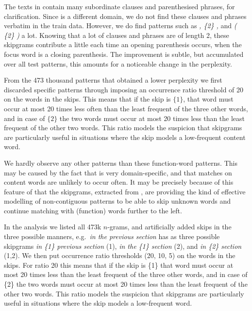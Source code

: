 The texts in \emea contain many subordinate clauses and parenthesised phrases, for clarification. Since \obw is a different domain, we do not find these clauses and phrases verbatim in the train data. However, we do find patterns such as \emph{, \{2\} ,} and \emph{( \{2\} )} a lot. Knowing that a lot of clauses and phrases are of length 2, these skipgrams contribute a little each time an opening parenthesis occurs, when the focus word is a closing parenthesis. The improvement is subtle, but accumulated over all test patterns, this amounts for a noticeable change in the perplexity.

From the 473 thousand patterns that obtained a lower perplexity we first discarded specific patterns through imposing an occurrence ratio threshold of 20 on the words in the skips. This means that if the skip is $\{1\}$, that word must occur at most 20 times less often than the least frequent of the three other words, and in case of $\{2\}$ the two words must occur at most 20 times less than the least frequent of the other two words. This ratio models the suspicion that skipgrams are particularly useful in situations where the skip models a low-frequent content word. 

We hardly observe any other patterns than these function-word patterns. 
This may be caused by the fact that \emea is very domain-specific, and that matches on content words are unlikely to occur often. It may be precisely because of this feature of \emea that the skipgrams, extracted from \obw, are providing the kind of effective modelling of non-contiguous patterns to be able to skip unknown words and continue matching with (function) words further to the left.

In the analysis we listed all 473k $n$-grams, and artificially added skips in the three possible manners, e.g.~\emph{in the previous section} has as three possible skipgrams \emph{in \{1\} previous section} (1), \emph{in the \{1\} section} (2), and \emph{in \{2\} section} (1,2). We then put occurrence ratio thresholds (20, 10, 5) on the words in the skips. For ratio 20 this means that if the skip is \{1\} that word must occur at most 20 times less than the least frequent of the three other words, and in case of \{2\} the two words must occur at most 20 times less than the least frequent of the other two words. This ratio models the suspicion that skipgrams are particularly useful in situations where the skip models a low-frequent word. 

